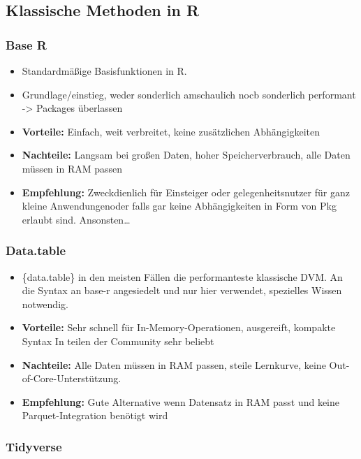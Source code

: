 \documentclass[
  german,
  10pt,
  twoside]{article}
\providecommand{\tightlist}{%
  \setlength{\itemsep}{0pt}\setlength{\parskip}{0pt}}
\begin{document}
\subsection{Klassische Methoden in R}\label{klassische-methoden-in-r}

\subsubsection{Base R}\label{base-r}

\begin{itemize}
\tightlist
\item
  Standardmäßige Basisfunktionen in R.
\item
  Grundlage/einstieg, weder sonderlich amschaulich nocb sonderlich
  performant -\textgreater{} Packages überlassen
\item
  \textbf{Vorteile:} Einfach, weit verbreitet, keine zusätzlichen
  Abhängigkeiten
\item
  \textbf{Nachteile:} Langsam bei großen Daten, hoher Speicherverbrauch,
  alle Daten müssen in RAM passen
\item
  \textbf{Empfehlung:} Zweckdienlich für Einsteiger oder
  gelegenheitsnutzer für ganz kleine Anwendungenoder falls gar keine
  Abhängigkeiten in Form von Pkg erlaubt sind. Ansonsten\ldots{}
\end{itemize}

\subsubsection{Data.table}\label{data.table}

\begin{itemize}
\tightlist
\item
  \{data.table\} \autocite{R-data.table} in den meisten Fällen die
  performanteste klassische DVM. An die Syntax an base-r angesiedelt und
  nur hier verwendet, spezielles Wissen notwendig.
\item
  \textbf{Vorteile:} Sehr schnell für In-Memory-Operationen, ausgereift,
  kompakte Syntax In teilen der Community sehr beliebt
\item
  \textbf{Nachteile:} Alle Daten müssen in RAM passen, steile Lernkurve,
  keine Out-of-Core-Unterstützung.
\item
  \textbf{Empfehlung:} Gute Alternative wenn Datensatz in RAM passt und
  keine Parquet-Integration benötigt wird
\end{itemize}

\subsubsection{Tidyverse}\label{tidyverse}
\end{document}
